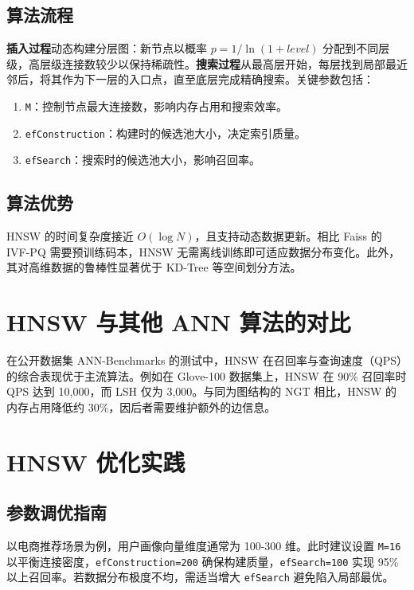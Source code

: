 \section{算法流程}
\textbf{插入过程}动态构建分层图：新节点以概率 $p = 1/\ln\left(1 + level\right)$ 分配到不同层级，高层级连接数较少以保持稀疏性。\textbf{搜索过程}从最高层开始，每层找到局部最近邻后，将其作为下一层的入口点，直至底层完成精确搜索。关键参数包括：\par
\begin{enumerate}
\item \verb!M!：控制节点最大连接数，影响内存占用和搜索效率。
\item \verb!efConstruction!：构建时的候选池大小，决定索引质量。
\item \verb!efSearch!：搜索时的候选池大小，影响召回率。
\end{enumerate}
\section{算法优势}
HNSW 的时间复杂度接近 $O(\log N)$，且支持动态数据更新。相比 Faiss 的 IVF-PQ 需要预训练码本，HNSW 无需离线训练即可适应数据分布变化。此外，其对高维数据的鲁棒性显著优于 KD-Tree 等空间划分方法。\par
\chapter{HNSW 与其他 ANN 算法的对比}
在公开数据集 ANN-Benchmarks 的测试中，HNSW 在召回率与查询速度（QPS）的综合表现优于主流算法。例如在 Glove-100 数据集上，HNSW 在 90\%{} 召回率时 QPS 达到 10,000，而 LSH 仅为 3,000。与同为图结构的 NGT 相比，HNSW 的内存占用降低约 30\%{}，因后者需要维护额外的边信息。\par
\chapter{HNSW 优化实践}
\section{参数调优指南}
以电商推荐场景为例，用户画像向量维度通常为 100-300 维。此时建议设置 \verb!M=16! 以平衡连接密度，\verb!efConstruction=200! 确保构建质量，\verb!efSearch=100! 实现 95\%{} 以上召回率。若数据分布极度不均，需适当增大 \verb!efSearch! 避免陷入局部最优。\par
